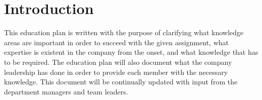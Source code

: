 \section{Introduction}
\label{sec:introduction}

This education plan is written with the purpose of clarifying what knowledge areas are important in order to succeed with the given assignment, what expertise is existent in the company from the onset, and what knowledge that has to be required. The education plan will also document what the company leadership has done in order to provide each member with the necessary knowledge. This document will be continually updated with input from the department managers and team leaders. 
